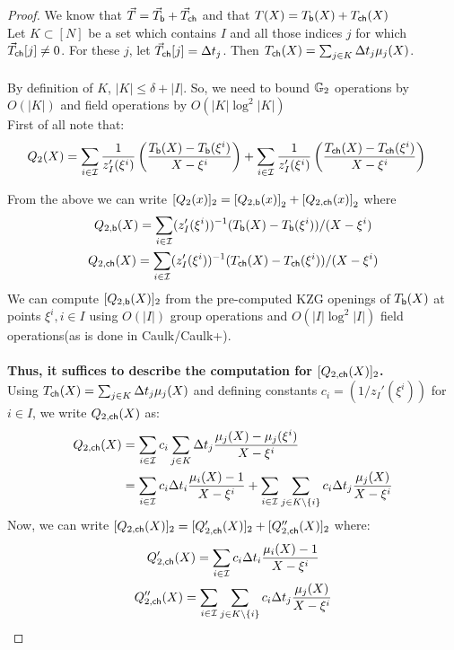 \begin{proof}
    We know that $\vec{T}=\vec{T}_{\mathsf{b}}+\vec{T}_{\mathsf{ch}}$ and that $T(X)=T_{\mathsf{b}}({X})+T_{\mathsf{ch}}({X})$\\

    Let $K \subset [N]$ be a set which contains $I$ and all those indices $j$ for which $\vec{T}_{\mathsf{ch}}[j] \neq 0$. For these $j$, let $\vec{T}_{\mathsf{ch}}[j]=\Delta t_j$. Then $T_{\mathsf{ch}}({X})=\sum_{j\in K}\Delta t_j\mu_j(X)$.\\\\
    By definition of $K$, $|K|\leq \delta +|I|$. So, we need to bound $\mathbb{G}_2$ operations by $O(|K|)$ and field operations by $O(|K| \log^2|K|)$\\
    First of all note that:
    \begin{align}\label{eq:Q2-upd}
    Q_2(X) &= \sum_{i\in \mathcal{I}}\frac{1}{z_I'(\xi^i)}\left(\frac{T_{\mathsf{b}}({X}) - T_{\mathsf{b}}({\xi^i})}{X-\xi^i}\right)
    + \sum_{i\in \mathcal{I}}\frac{1}{z_I'(\xi^i)}\left(\frac{T_{\mathsf{ch}}({X}) - T_{\mathsf{ch}}({\xi^i})}{X-\xi^i}\right)
    \end{align}

    From the above we can write $[Q_2(x)]_2=\left[{Q_{2,\mathsf{b}}({x})}\right]_2+\left[{Q_{2,\mathsf{ch}}({x})}\right]_2$ where
    \begin{gather*}
        Q_{2,\mathsf{b}}({X})=\sum_{i\in \mathcal{I}}(z_I'(\xi^i))^{-1} (T_{\mathsf{b}}({X})-T_{\mathsf{b}}({\xi^i}))/(X-\xi^i) \\
        Q_{2,\mathsf{ch}}({X})=\sum_{i\in \mathcal{I}}(z_I'(\xi^i))^{-1} (T_{\mathsf{ch}}({X})-T_{\mathsf{ch}}({\xi^i}))/(X-\xi^i)
    \end{gather*}
    We can compute
    $[Q_{2,\mathsf{b}}({X})]_2$ from the pre-computed KZG openings of $T_{\mathsf{b}}({X})$ at points $\xi^i,i\in I$ using $O(|I|)$ group operations and
    $O(|I|\log^2 |I|)$ field operations(as is done in Caulk/Caulk+).\\\\

    \textbf{Thus, it suffices to describe the computation for $[Q_{2,\mathsf{ch}}({X})]_2$. }\\
    Using
    $T_{\mathsf{ch}}({X})=\sum_{j\in K}\Delta t_j\mu_j(X)$ and defining constants $c_i=(1/z_I'(\xi^i))$ for $i\in I$,
    we write $Q_{2,\mathsf{ch}}({X})$ as:
    \begin{align*}
        Q_{2,\mathsf{ch}}({X}) &= \sum_{i\in \mathcal{I}} c_i\sum_{j\in K} \Delta t_j\frac{\mu_j(X)-\mu_j(\xi^i)}{X-\xi^i} \\
        &= \sum_{i\in \mathcal{I}} c_i\Delta t_i\frac{\mu_i(X) - 1}{X-\xi^i} + \sum_{i\in \mathcal{I}}\sum_{j\in K\setminus\{i\}}c_i\Delta t_j\frac{\mu_j(X)}{X-\xi^i}
    \end{align*}
    Now, we can write $[Q_{2,\mathsf{ch}}({X})]_2=[Q'_{2,\mathsf{ch}}({X})]_2 + [Q''_{2,\mathsf{ch}}({X})]_2$ where:
    \begin{gather*}
        Q'_{2,\mathsf{ch}}({X})=\sum_{i\in \mathcal{I}}c_i\Delta t_i\frac{\mu_i(X)-1}{X-\xi^i} \\
        Q''_{2,\mathsf{ch}}({X})=\sum_{i\in \mathcal{I}}\sum_{j\in K\setminus \{i\}} c_i\Delta t_j\frac{\mu_j(X)}{X-\xi^i}
    \end{gather*}


\end{proof}
